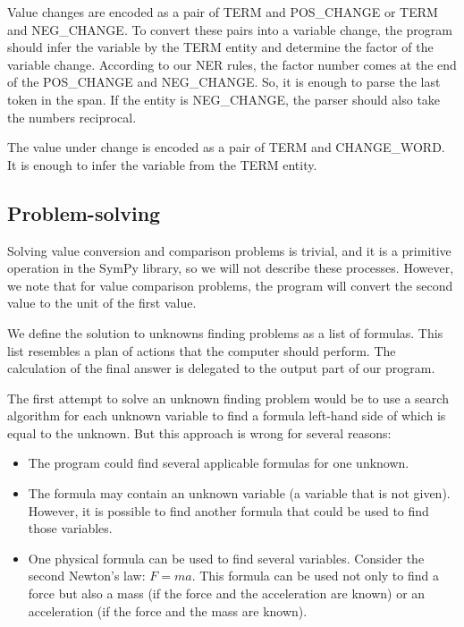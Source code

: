 \documentclass[a4paper, 12pt]{article}
\begin{document}
	Value changes are encoded as a pair of TERM and POS\_CHANGE or TERM and
	NEG\_CHANGE. To convert these pairs into a variable change, the program
	should infer the variable by the TERM entity and determine the factor of
	the variable change. According to our NER rules, the factor number comes
	at the end of the POS\_CHANGE and NEG\_CHANGE. So, it is enough to parse
	the last token in the span. If the entity is NEG\_CHANGE, the parser
	should also take the number\textquotesingle s reciprocal.
	
	The value under change is encoded as a pair of TERM and CHANGE\_WORD. It
	is enough to infer the variable from the TERM entity.
	
	\subsection{Problem-solving}
	
	Solving value conversion and comparison problems is trivial, and it is a
	primitive operation in the SymPy library, so we will not describe these
	processes. However, we note that for value comparison problems, the
	program will convert the second value to the unit of the first value.
	
	We define the solution to unknowns finding problems as a list of
	formulas. This list resembles a plan of actions that the computer should
	perform. The calculation of the final answer is delegated to the output
	part of our program.
	
	The first attempt to solve an unknown finding problem would be to use a
	search algorithm for each unknown variable to find a formula left-hand
	side of which is equal to the unknown. But this approach is wrong for
	several reasons:
	
	\begin{itemize}
	\item
	  The program could find several applicable formulas for one unknown.
	\item
	  The formula may contain an unknown variable (a variable that is not
	  given). However, it is possible to find another formula that could be
	  used to find those variables.
	\item
	  One physical formula can be used to find several variables. Consider
	  the second Newton's law: \(F = ma\). This formula can be used not only
	  to find a force but also a mass (if the force and the acceleration are
	  known) or an acceleration (if the force and the mass are known).
	\end{itemize}
	
\end{document}
